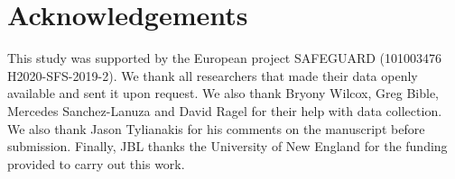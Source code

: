 \documentclass[
  12pt,
  a4paper,
]{article}
\begin{document}
\hypertarget{acknowledgements}{%
\section{Acknowledgements}\label{acknowledgements}}

This study was supported by the European project SAFEGUARD (101003476 H2020-SFS-2019-2). We thank all researchers that made their data openly available and sent it upon request. We also thank Bryony Wilcox, Greg Bible, Mercedes Sanchez-Lanuza and David Ragel for their help with data collection. We also thank Jason Tylianakis for his comments on the manuscript before submission. Finally, JBL thanks the University of New England for the funding provided to carry out this work.
\end{document}
